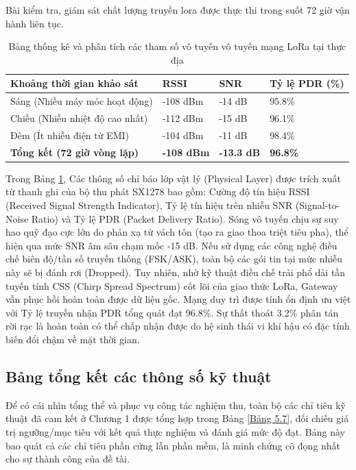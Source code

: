 Bài kiểm tra, giám sát chất lượng truyền lora được thực thi trong suốt 72 giờ vận hành liên tục. 

\begin{table}[H]
  \centering
  \caption{Bảng thống kê và phân tích các tham số vô tuyến vô tuyến mạng LoRa tại thực địa}
  \label{tab:field_rf_metrics}
  \begin{tabular}{p{6cm} p{2cm} p{2cm} p{2cm}}
      \toprule
      \textbf{Khoảng thời gian khảo sát} & \textbf{RSSI} & \textbf{SNR} & \textbf{Tỷ lệ PDR (\%)} \\
      \midrule
      Sáng (Nhiều máy móc hoạt động) & -108 dBm & -14 dB & 95.8\% \\
      Chiều (Nhiễu nhiệt độ cao nhất) & -112 dBm & -15 dB & 96.1\% \\
      Đêm (Ít nhiễu điện từ EMI) & -104 dBm & -11 dB & 98.4\% \\
      \midrule
      \textbf{Tổng kết (72 giờ vòng lặp)} & \textbf{-108 dBm} & \textbf{-13.3 dB} & \textbf{96.8\%} \\
      \bottomrule
  \end{tabular}
\end{table}

Trong Bảng \ref{tab:field_rf_metrics}, Các thông số chỉ báo lớp vật lý (Physical Layer)
được trích xuất từ thanh ghi của bộ thu phát SX1278 bao gồm: Cường độ tín hiệu RSSI
(Received Signal Strength Indicator), Tỷ lệ tín hiệu trên nhiễu SNR (Signal-to-Noise
Ratio) và Tỷ lệ PDR (Packet Delivery Ratio). Sóng vô tuyến chịu sự suy hao quỹ đạo cực lớn do phản xạ từ vách tôn (tạo ra giao thoa triệt tiêu pha), thể hiện qua mức SNR âm sâu chạm mốc -15 dB. Nếu sử dụng các công nghệ điều chế biên độ/tần số truyền thống (FSK/ASK), toàn bộ các gói tin tại mức nhiễu này sẽ bị đánh rơi (Dropped). Tuy nhiên, nhờ kỹ thuật điều chế trải phổ dải tần tuyến tính CSS (Chirp Spread Spectrum) cốt lõi của giao thức LoRa, Gateway vẫn phục hồi hoàn toàn được dữ liệu gốc. Mạng duy trì được tính ổn định ưu việt với Tỷ lệ truyền nhận PDR tổng quát đạt 96.8\%. Sự thất thoát 3.2\% phân tán rời rạc là hoàn toàn có thể chấp nhận được do hệ sinh thái vi khí hậu có đặc tính biến đổi chậm về mặt thời gian. 

\subsection{Bảng tổng kết các thông số kỹ thuật}
Để có cái nhìn tổng thể và phục vụ công tác nghiệm thu, toàn bộ các chỉ tiêu kỹ thuật đã cam kết ở Chương 1 được tổng hợp trong Bảng \ref{Bảng 5.7}, đối chiếu giá trị ngưỡng/mục tiêu với kết quả thực nghiệm và đánh giá mức độ đạt. Bảng này bao quát cả các chỉ tiêu phần cứng lẫn phần mềm, là minh chứng cô đọng nhất cho sự thành công của đề tài.

